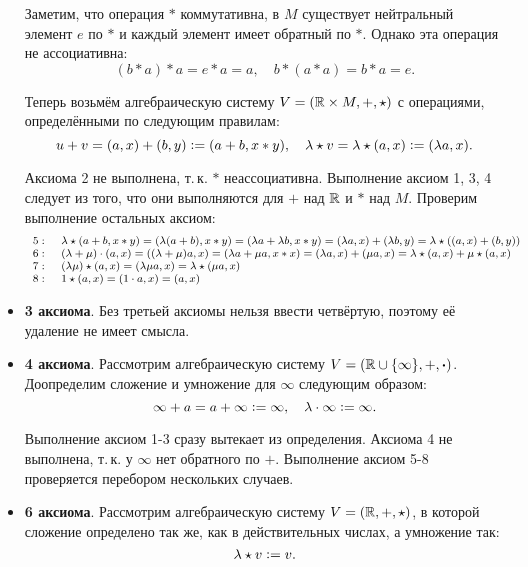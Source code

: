 \begin{solution}
\begin{itemize}
            Заметим, что операция $\ast$ коммутативна, в $M$ существует нейтральный элемент $e$ по $\ast$ и каждый элемент имеет обратный по $\ast$. Однако эта операция не ассоциативна:
            $$
            (b \ast a) \ast a = e \ast a = a,\quad b \ast (a \ast a) = b \ast a = e.
            $$

            Теперь возьмём алгебраическую систему $V = (\mathbb{R} \times M, +, \star)$ с операциями, определёнными по следующим правилам:
            $$
            u + v = (a, x) + (b, y) \vcentcolon = (a + b, x \ast y),\quad \lambda \star v = \lambda \star (a, x) \vcentcolon = (\lambda a, x).
            $$

            Аксиома 2 не выполнена, т.\,к. $\ast$ неассоциативна. Выполнение аксиом 1, 3, 4 следует из того, что они выполняются для $+$ над $\mathbb{R}$ и $\ast$ над $M$. Проверим выполнение остальных аксиом:
            $$\footnotesize
            \begin{array}{rl}
                5:\; & \lambda \star (a + b, x \ast y) = (\lambda(a + b), x \ast y) = (\lambda a + \lambda b, x \ast y) = (\lambda a, x) + (\lambda b, y) = \lambda\star((a, x) + (b, y))\\
                6:\; & (\lambda + \mu) \cdot (a, x) = ((\lambda + \mu)a, x) = (\lambda a + \mu a, x \ast x) = (\lambda a, x) + (\mu a, x) = \lambda \star (a, x) + \mu \star (a, x)\\
                7:\; & (\lambda\mu) \star (a, x) = (\lambda\mu a, x) = \lambda \star (\mu a, x)\\
                8:\; & 1 \star (a, x) = (1 \cdot a, x) = (a, x)
            \end{array}
            $$
        \item \textbf{3 аксиома}. Без третьей аксиомы нельзя ввести четвёртую, поэтому её удаление не имеет смысла.
        \item \textbf{4 аксиома}. Рассмотрим алгебраическую систему $V = (\mathbb{R} \cup \{\infty\}, +, \boldsymbol{\cdot})$. Доопределим сложение и умножение для $\infty$ следующим образом:
            $$
            \infty + a = a + \infty \vcentcolon = \infty,\quad \lambda \cdot \infty \vcentcolon = \infty.
            $$

            Выполнение аксиом 1-3 сразу вытекает из определения. Аксиома 4 не выполнена, т.\,к. у $\infty$ нет обратного по $+$. Выполнение аксиом 5-8 проверяется перебором нескольких случаев.
        \item \textbf{6 аксиома}. Рассмотрим алгебраическую систему $V = (\mathbb{R}, +, \star)$, в которой сложение определено так же, как в действительных числах, а умножение так:
            $$
            \lambda \star v \vcentcolon = v.
            $$


\end{itemize}
\end{solution}
